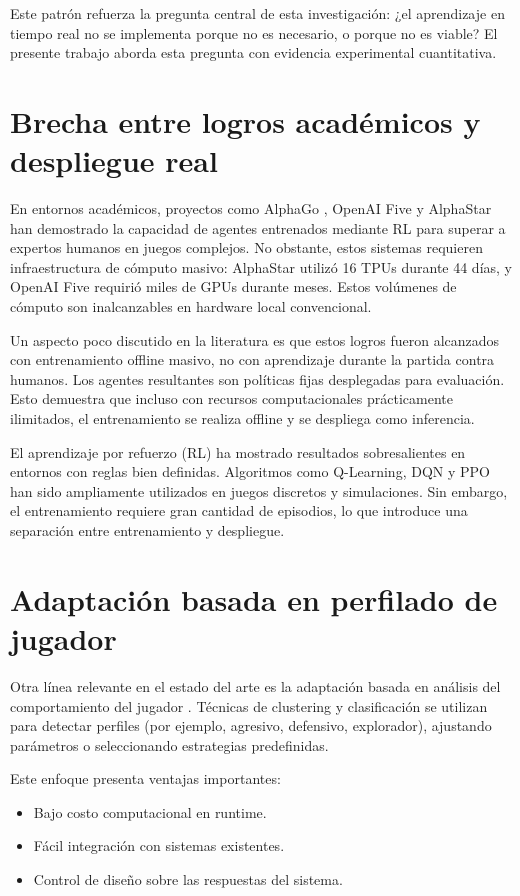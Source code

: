 Este patrón refuerza la pregunta central de esta investigación: ¿el aprendizaje en tiempo real no se implementa porque no es necesario, o porque no es viable? El presente trabajo aborda esta pregunta con evidencia experimental cuantitativa.

\section{Brecha entre logros académicos y despliegue real}

En entornos académicos, proyectos como AlphaGo \cite{silver2016mastering}, OpenAI Five y AlphaStar \cite{vinyals2019grandmaster} han demostrado la capacidad de agentes entrenados mediante RL para superar a expertos humanos en juegos complejos. No obstante, estos sistemas requieren infraestructura de cómputo masivo: AlphaStar utilizó 16 TPUs durante 44 días, y OpenAI Five requirió miles de GPUs durante meses. Estos volúmenes de cómputo son inalcanzables en hardware local convencional.

Un aspecto poco discutido en la literatura es que estos logros fueron alcanzados con entrenamiento offline masivo, no con aprendizaje durante la partida contra humanos. Los agentes resultantes son políticas fijas desplegadas para evaluación. Esto demuestra que incluso con recursos computacionales prácticamente ilimitados, el entrenamiento se realiza offline y se despliega como inferencia.

El aprendizaje por refuerzo (RL) ha mostrado resultados sobresalientes en entornos con reglas bien definidas. Algoritmos como Q-Learning, DQN \cite{mnih2015dqn} y PPO \cite{schulman2017ppo} han sido ampliamente utilizados en juegos discretos y simulaciones. Sin embargo, el entrenamiento requiere gran cantidad de episodios, lo que introduce una separación entre entrenamiento y despliegue.

\section{Adaptación basada en perfilado de jugador}

Otra línea relevante en el estado del arte es la adaptación basada en análisis del comportamiento del jugador \cite{yannakakis2013player}. Técnicas de clustering y clasificación se utilizan para detectar perfiles (por ejemplo, agresivo, defensivo, explorador), ajustando parámetros o seleccionando estrategias predefinidas.

Este enfoque presenta ventajas importantes:
\begin{itemize}
    \item Bajo costo computacional en runtime.
    \item Fácil integración con sistemas existentes.
    \item Control de diseño sobre las respuestas del sistema.
\end{itemize}

